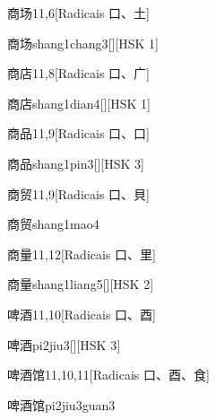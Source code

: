 \begin{entry}{商场}{11,6}[Radicais ⼝、⼟]
  \begin{phonetics}{商场}{shang1chang3}[][HSK 1]
  \end{phonetics}
\end{entry}

\begin{entry}{商店}{11,8}[Radicais ⼝、⼴]
  \begin{phonetics}{商店}{shang1dian4}[][HSK 1]
  \end{phonetics}
\end{entry}

\begin{entry}{商品}{11,9}[Radicais ⼝、⼝]
  \begin{phonetics}{商品}{shang1pin3}[][HSK 3]
  \end{phonetics}
\end{entry}

\begin{entry}{商贸}{11,9}[Radicais ⼝、⾙]
  \begin{phonetics}{商贸}{shang1mao4}
  \end{phonetics}
\end{entry}

\begin{entry}{商量}{11,12}[Radicais ⼝、⾥]
  \begin{phonetics}{商量}{shang1liang5}[][HSK 2]
  \end{phonetics}
\end{entry}

\begin{entry}{啤酒}{11,10}[Radicais ⼝、⾣]
  \begin{phonetics}{啤酒}{pi2jiu3}[][HSK 3]
  \end{phonetics}
\end{entry}

\begin{entry}{啤酒馆}{11,10,11}[Radicais ⼝、⾣、⾷]
  \begin{phonetics}{啤酒馆}{pi2jiu3guan3}
  \end{phonetics}
\end{entry}

